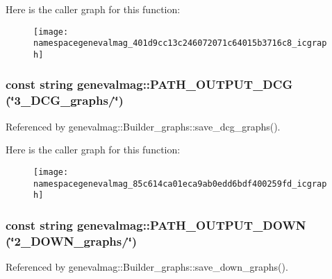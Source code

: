 Here is the caller graph for this function:\nopagebreak
\begin{figure}[H]
\begin{center}
\leavevmode
\texttt{[image: namespacegenevalmag\_401d9cc13c246072071c64015b3716c8\_icgraph]}
\end{center}
\end{figure}
\hypertarget{namespacegenevalmag_85c614ca01eca9ab0edd6bdf400259fd}{
\subsubsection[{PATH\_\-OUTPUT\_\-DCG}]{\setlength{\rightskip}{0pt plus 5cm}const string genevalmag::PATH\_\-OUTPUT\_\-DCG (\char`\"{}3\_\-DCG\_\-graphs/\char`\"{})}}
\label{namespacegenevalmag_85c614ca01eca9ab0edd6bdf400259fd}




Referenced by genevalmag::Builder\_\-graphs::save\_\-dcg\_\-graphs().

Here is the caller graph for this function:\nopagebreak
\begin{figure}[H]
\begin{center}
\leavevmode
\texttt{[image: namespacegenevalmag\_85c614ca01eca9ab0edd6bdf400259fd\_icgraph]}
\end{center}
\end{figure}
\hypertarget{namespacegenevalmag_fce5456f0ffc52ff62202b4c185d453c}{
\subsubsection[{PATH\_\-OUTPUT\_\-DOWN}]{\setlength{\rightskip}{0pt plus 5cm}const string genevalmag::PATH\_\-OUTPUT\_\-DOWN (\char`\"{}2\_\-DOWN\_\-graphs/\char`\"{})}}
\label{namespacegenevalmag_fce5456f0ffc52ff62202b4c185d453c}




Referenced by genevalmag::Builder\_\-graphs::save\_\-down\_\-graphs().

